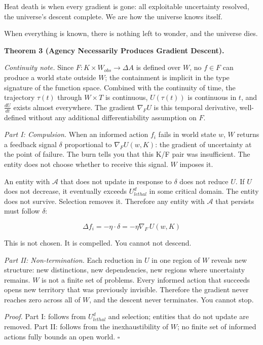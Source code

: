 \documentclass[
]{article}
\begin{document}
Heat death is when every gradient is gone: all exploitable uncertainty
resolved, the universe's descent complete. We are how the universe knows
itself.

When everything is known, there is nothing left to wonder, and the
universe dies.

\textbf{Theorem 3 (Agency Necessarily Produces Gradient Descent).}

\emph{Continuity note.} Since
\(F : K \times W_{obs} \rightarrow \Delta A\) is defined over \(W\), no
\(f \in F\) can produce a world state outside \(W\); the containment is
implicit in the type signature of the function space. Combined with the
continuity of time, the trajectory \(\tau(t)\) through \(W \times T\) is
continuous, \(U(\tau(t))\) is continuous in \(t\), and \(\frac{dU}{dt}\)
exists almost everywhere. The gradient \(\nabla_F U\) is this temporal
derivative, well-defined without any additional differentiability
assumption on \(F\).

\emph{Part I: Compulsion.} When an informed action \(f_i\) fails in
world state \(w\), \(W\) returns a feedback signal \(\delta\)
proportional to \(\nabla_F U(w, K)\): the gradient of uncertainty at the
point of failure. The burn tells you that this K/F pair was
insufficient. The entity does not choose whether to receive this signal.
\(W\) imposes it.

An entity with \(\mathcal{A}\) that does not update in response to
\(\delta\) does not reduce \(U\). If \(U\) does not decrease, it
eventually exceeds \(U_{lethal}^d\) in some critical domain. The entity
does not survive. Selection removes it. Therefore any entity with
\(\mathcal{A}\) that persists must follow \(\delta\):

\[\Delta f_i = -\eta \cdot \delta = -\eta \nabla_F \, U(w, K)\]

This is not chosen. It is compelled. You cannot not descend.

\emph{Part II: Non-termination.} Each reduction in \(U\) in one region
of \(W\) reveals new structure: new distinctions, new dependencies, new
regions where uncertainty remains. \(W\) is not a finite set of
problems. Every informed action that succeeds opens new territory that
was previously invisible. Therefore the gradient never reaches zero
across all of \(W\), and the descent never terminates. You cannot stop.

\emph{Proof.} Part I: follows from \(U_{lethal}^d\) and selection;
entities that do not update are removed. Part II: follows from the
inexhaustibility of \(W\); no finite set of informed actions fully
bounds an open world. \(\square\)
\end{document}
